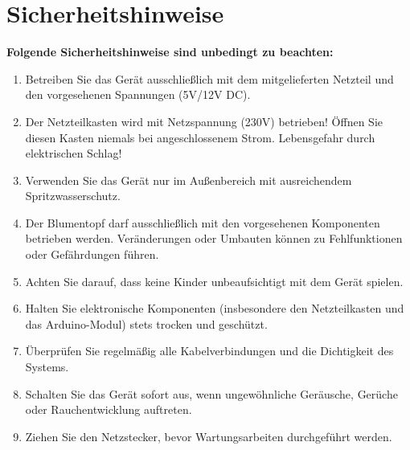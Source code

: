 %
%
%

\chapter{Sicherheitshinweise}
\textbf{Folgende Sicherheitshinweise sind unbedingt zu beachten:}\\
\begin{enumerate}
	\item Betreiben Sie das Gerät ausschließlich mit dem mitgelieferten Netzteil und den vorgesehenen Spannungen (5V/12V DC).
	\item Der Netzteilkasten wird mit Netzspannung (230V) betrieben! Öffnen Sie diesen Kasten niemals bei angeschlossenem Strom. Lebensgefahr durch elektrischen Schlag!
	\item Verwenden Sie das Gerät nur im Außenbereich mit ausreichendem Spritzwasserschutz.
	\item Der Blumentopf darf ausschließlich mit den vorgesehenen Komponenten betrieben werden. Veränderungen oder Umbauten können zu Fehlfunktionen oder Gefährdungen führen.
	\item Achten Sie darauf, dass keine Kinder unbeaufsichtigt mit dem Gerät spielen.
	\item Halten Sie elektronische Komponenten (insbesondere den Netzteilkasten und das Arduino-Modul) stets trocken und geschützt.
	\item Überprüfen Sie regelmäßig alle Kabelverbindungen und die Dichtigkeit des Systems.
	\item Schalten Sie das Gerät sofort aus, wenn ungewöhnliche Geräusche, Gerüche oder Rauchentwicklung auftreten.
	\item Ziehen Sie den Netzstecker, bevor Wartungsarbeiten durchgeführt werden.
\end{enumerate}




